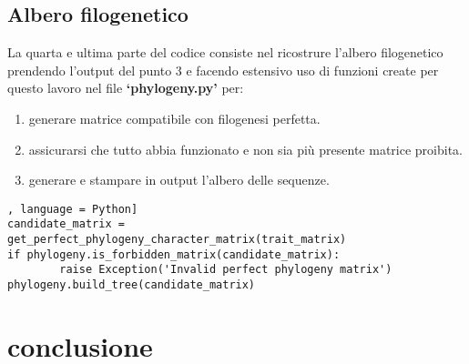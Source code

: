 \documentclass[11pt,italian]{article}
\begin{document}

\subsection{Albero filogenetico}
La quarta e ultima parte del codice consiste nel ricostrure l'albero filogenetico prendendo l'output del punto 3 e facendo estensivo uso di funzioni create per questo lavoro nel file \textbf{`phylogeny.py'} per:
\begin{enumerate}
	\item generare matrice compatibile con filogenesi perfetta.
	\item assicurarsi che tutto abbia funzionato e non sia più presente matrice proibita.
	\item generare e stampare in output l'albero delle sequenze.
\end{enumerate}
\begin{lstlisting}[basicstyle=\small\ttfamily,caption=Porzione di ciclo,label=code:creation table.csv = [], language = Python]
candidate_matrix = get_perfect_phylogeny_character_matrix(trait_matrix)
if phylogeny.is_forbidden_matrix(candidate_matrix):
        raise Exception('Invalid perfect phylogeny matrix')
phylogeny.build_tree(candidate_matrix)
\end{lstlisting}

\section{conclusione}
\end{document}
